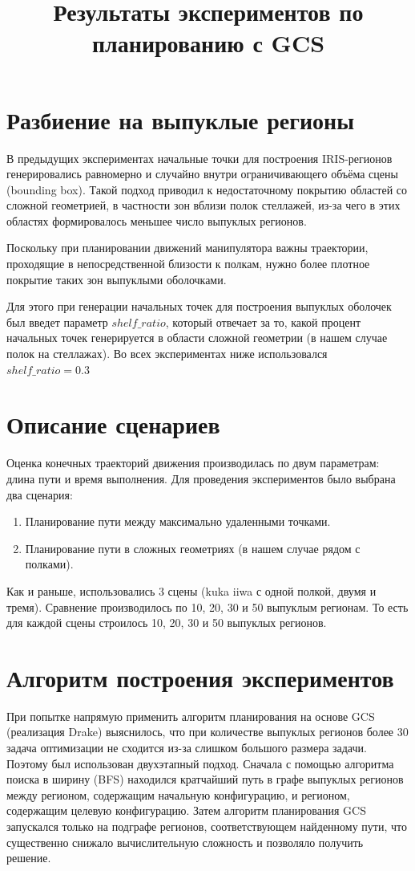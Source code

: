 \documentclass[a4paper]{article}
\title{Результаты экспериментов по планированию с GCS}
\date{}
\begin{document}
\maketitle


\section{Разбиение на выпуклые регионы}
В предыдущих экспериментах начальные точки для построения IRIS-регионов генерировались равномерно и случайно внутри ограничивающего объёма сцены (bounding box). Такой подход приводил к недостаточному покрытию областей со сложной геометрией, в частности зон вблизи полок стеллажей, из-за чего в этих областях формировалось меньшее число выпуклых регионов.

Поскольку при планировании движений манипулятора важны траектории, проходящие в непосредственной близости к полкам, нужно более плотное покрытие таких зон выпуклыми оболочками.

Для этого при генерации начальных точек для построения выпуклых оболочек был введет параметр $shelf\_ratio$, который отвечает за то, какой процент начальных точек генерируется в области сложной геометрии (в нашем случае полок на стеллажах). Во всех экспериментах ниже использовался $shelf\_ratio = 0.3$


\section{Описание сценариев}
Оценка конечных траекторий движения производилась по двум параметрам: длина пути и время выполнения. Для проведения экспериментов было выбрана два сценария:
\begin{enumerate}
    \item Планирование пути между максимально удаленными точками.
    \item Планирование пути в сложных геометриях (в нашем случае рядом с полками).
\end{enumerate}
Как и раньше, использовались 3 сцены (kuka iiwa с одной полкой, двумя и тремя). Сравнение производилось по 10, 20, 30 и 50 выпуклым регионам. То есть
для каждой сцены строилось 10, 20, 30 и 50 выпуклых регионов.

\section{Алгоритм построения экспериментов}

При попытке напрямую применить алгоритм планирования на основе GCS (реализация Drake) выяснилось, что при количестве выпуклых регионов более 30 задача оптимизации не сходится из-за слишком большого размера задачи.
Поэтому был использован двухэтапный подход. Сначала с помощью алгоритма поиска в ширину (BFS) находился кратчайший путь в графе выпуклых регионов между регионом, содержащим начальную конфигурацию,
и регионом, содержащим целевую конфигурацию. Затем алгоритм планирования GCS запускался только на подграфе регионов, соответствующем найденному пути, что существенно снижало вычислительную сложность и позволяло получить решение.
\end{document}

